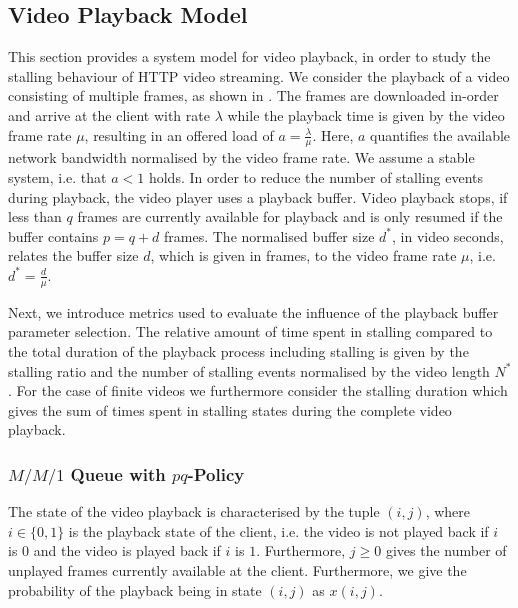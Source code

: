\subsection{Video Playback Model}\label{sec:application:qoe_user_behaviour:system_model}
This section provides a system model for video playback, in order to study the stalling behaviour of \gls{HTTP} video streaming.
We consider the playback of a video consisting of multiple frames, as shown in .
The frames are downloaded in-order and arrive at the client with rate \(\lambda\) while the playback time is given by the video frame rate \(\mu\), resulting in an offered load of \(a = \frac{\lambda}{\mu}\). Here, \(a\) quantifies the available network bandwidth normalised by the video frame rate. We assume a stable system, i.e. that \(a < 1\) holds.
In order to reduce the number of stalling events during playback, the video player uses a playback buffer.
Video playback stops, if less than \(q\) frames are currently available for playback and is only resumed if the buffer contains \(p = q + d\) frames. 
The normalised buffer size \(d^*\), in video seconds, relates the buffer size \(d\), which is given in frames, to the video frame rate \(\mu\), i.e. \(d^*=\frac{d}{\mu}\).

Next, we introduce metrics used to evaluate the influence of the playback buffer parameter selection.
The relative amount of time spent in stalling compared to the total duration of the playback process including stalling is given by the stalling ratio \stallingRatio and the number of stalling events normalised by the video length \(N^*\).
For the case of finite videos we furthermore consider the stalling duration \stallingDuration which gives the sum of times spent in stalling states during the complete video playback. 


\subsubsection*{\(M/M/1\) Queue with \(pq\)-Policy}\label{sec:application:qoe_user_behaviour:system_model:mm1pq}
The state of the video playback is characterised by the tuple \((i, j)\), where \(i \in \{0, 1\}\) is the playback state of the client, i.e. the video is not played back if \(i\) is \(0\) and the video is played back if \(i\) is \(1\).
Furthermore, \(j \geq 0\) gives the number of unplayed frames currently available at the client.
Furthermore, we give the probability of the playback being in state \((i, j)\) as \(x(i, j)\).

